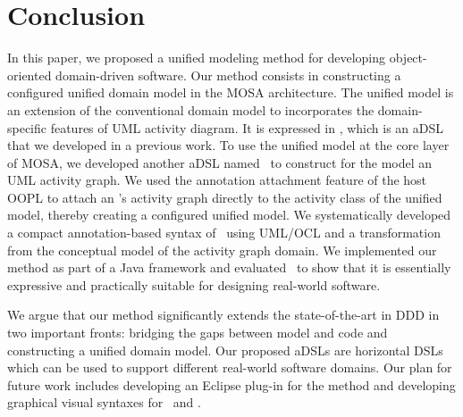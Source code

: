 %
\section{Conclusion}\label{sect:conclusion} %
In this paper, we proposed a unified modeling method for developing object-oriented domain-driven software. Our method consists in constructing a configured unified domain model in the MOSA architecture. The unified model is an extension of the conventional domain model to incorporates the domain-specific features of UML activity diagram. It is expressed in \dcsl, which is an aDSL that we developed in a previous work. To use the unified model at the core layer of MOSA, we developed another aDSL named \agl~to construct for the model an UML activity graph. We used the annotation attachment feature of the host OOPL to attach an \agl's activity graph directly to the activity class of the unified model, thereby creating a configured unified model.
We systematically developed a compact annotation-based syntax of \agl~using UML/OCL and a transformation from the conceptual model of the activity graph domain.
%
We implemented our method as part of a Java framework and evaluated \agl~to show that it is essentially expressive and practically suitable for designing real-world software. 

We argue that our method significantly extends the state-of-the-art in DDD in two important fronts: bridging the gaps between model and code and constructing a unified domain model. Our proposed aDSLs are horizontal DSLs which can be used to support different real-world software domains.
%
Our plan for future work includes
developing an Eclipse plug-in for the method and developing graphical visual syntaxes for \dcsl~and \agl.
